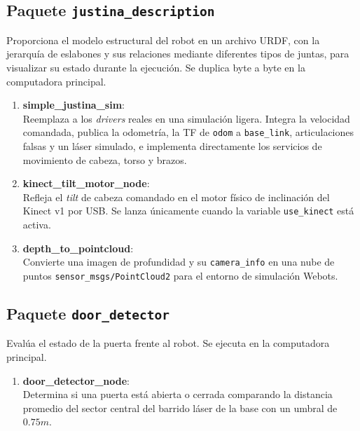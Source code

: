 \subsection{Paquete \texttt{justina\_description}}

Proporciona el modelo estructural del robot en un archivo URDF, con la jerarquía de eslabones y sus relaciones mediante diferentes tipos de juntas, para visualizar su estado durante la ejecución. Se duplica byte a byte en la computadora principal.

\begin{enumerate}

\item \textbf{simple\_justina\_sim}: \\
Reemplaza a los \textit{drivers} reales en una simulación ligera. Integra la velocidad comandada, publica la odometría, la TF de \texttt{odom} a \texttt{base\_link}, articulaciones falsas y un láser simulado, e implementa directamente los servicios de movimiento de cabeza, torso y brazos.

\item \textbf{kinect\_tilt\_motor\_node}: \\
Refleja el \textit{tilt} de cabeza comandado en el motor físico de inclinación del Kinect v1 por USB. Se lanza únicamente cuando la variable \texttt{use\_kinect} está activa.

\item \textbf{depth\_to\_pointcloud}: \\
Convierte una imagen de profundidad y su \texttt{camera\_info} en una nube de puntos \texttt{sensor\_msgs/PointCloud2} para el entorno de simulación Webots.

\end{enumerate}

\subsection{Paquete \texttt{door\_detector}}

Evalúa el estado de la puerta frente al robot. Se ejecuta en la computadora principal.

\begin{enumerate}

\item \textbf{door\_detector\_node}: \\
Determina si una puerta está abierta o cerrada comparando la distancia promedio del sector central del barrido láser de la base con un umbral de $0.75m$.

\end{enumerate}

